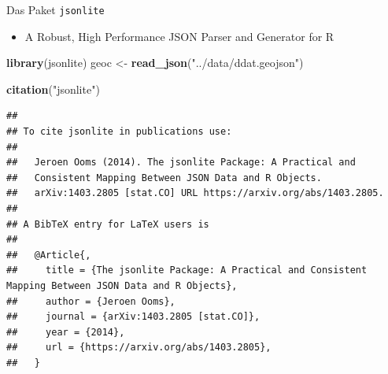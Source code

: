 \documentclass[ignorenonframetext,]{beamer}
\newenvironment{Shaded}{\begin{snugshade}}{\end{snugshade}}
\newcommand{\KeywordTok}[1]{\textcolor[rgb]{0.13,0.29,0.53}{\textbf{#1}}}
\newcommand{\NormalTok}[1]{#1}
\newcommand{\StringTok}[1]{\textcolor[rgb]{0.31,0.60,0.02}{#1}}
\providecommand{\tightlist}{%
  \setlength{\itemsep}{0pt}\setlength{\parskip}{0pt}}
\begin{document}
\begin{frame}[fragile]{Das Paket \texttt{jsonlite}}
\protect\hypertarget{das-paket-jsonlite}{}

\begin{itemize}
\tightlist
\item
  A Robust, High Performance JSON Parser and Generator for R
\end{itemize}

\begin{Shaded}
\begin{Highlighting}[]
\KeywordTok{library}\NormalTok{(jsonlite)}
\NormalTok{geoc <-}\StringTok{ }\KeywordTok{read_json}\NormalTok{(}\StringTok{"../data/ddat.geojson"}\NormalTok{)}
\end{Highlighting}
\end{Shaded}

\begin{Shaded}
\begin{Highlighting}[]
\KeywordTok{citation}\NormalTok{(}\StringTok{"jsonlite"}\NormalTok{)}
\end{Highlighting}
\end{Shaded}

\begin{verbatim}
## 
## To cite jsonlite in publications use:
## 
##   Jeroen Ooms (2014). The jsonlite Package: A Practical and
##   Consistent Mapping Between JSON Data and R Objects.
##   arXiv:1403.2805 [stat.CO] URL https://arxiv.org/abs/1403.2805.
## 
## A BibTeX entry for LaTeX users is
## 
##   @Article{,
##     title = {The jsonlite Package: A Practical and Consistent Mapping Between JSON Data and R Objects},
##     author = {Jeroen Ooms},
##     journal = {arXiv:1403.2805 [stat.CO]},
##     year = {2014},
##     url = {https://arxiv.org/abs/1403.2805},
##   }
\end{verbatim}

\end{frame}
\end{document}
